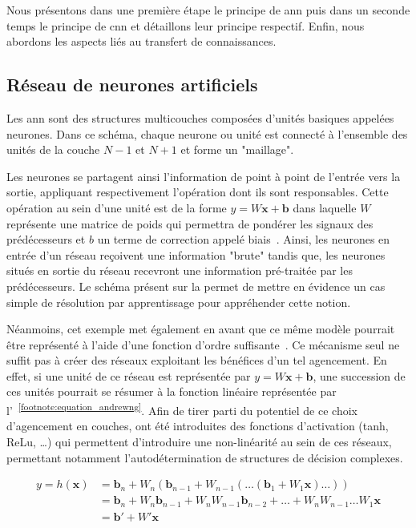 Nous présentons dans une première étape le principe de \gls{ann} puis dans un seconde temps le principe de \gls{cnn} et détaillons leur principe respectif. Enfin, nous abordons les aspects liés au transfert de connaissances.\par

\subsection{Réseau de neurones artificiels}
Les \gls{ann} sont des structures multicouches composées d'unités basiques appelées neurones. Dans ce schéma, chaque neurone ou unité est connecté à l'ensemble des unités de la couche $N-1$ et $N+1$ et forme un "maillage".\par

Les neurones se partagent ainsi l'information de point à point de l'entrée vers la sortie, appliquant respectivement l'opération dont ils sont responsables. Cette opération au sein d'une unité est de la forme $y = W\mathbf{x}+\mathbf{b}$ dans laquelle $W$ représente une matrice de poids qui permettra de pondérer les signaux des prédécesseurs et $b$ un terme de correction appelé biais~\cite{Stephen1990}. Ainsi, les neurones en entrée d'un réseau reçoivent une information "brute" tandis que, les neurones situés en sortie du réseau recevront une information pré-traitée par les prédécesseurs. Le schéma présent sur la  permet de mettre en évidence un cas simple de résolution par apprentissage pour appréhender cette notion.\par

Néanmoins, cet exemple met également en avant que ce même modèle pourrait être représenté à l'aide d'une fonction d'ordre suffisante~\cite{Bishop2006}. Ce mécanisme seul ne suffit pas à créer des réseaux exploitant les bénéfices d'un tel agencement. En effet, si une unité de ce réseau est représentée par $y = W\mathbf{x}+\mathbf{b}$, une succession de ces unités pourrait se résumer à la fonction linéaire représentée par l'~\textsuperscript{\ref{footnote:equation_andrewng}}. Afin de tirer parti du potentiel de ce choix d'agencement en couches, ont été introduites des fonctions d'activation (tanh, ReLu, \ldots) qui permettent d'introduire une non-linéarité au sein de ces réseaux, permettant notamment l’autodétermination de structures de décision complexes.\par

\begin{equation} 
    \label{eq:proof_linearity}
    \begin{split}
        y = h(\mathbf{x})   &=\mathbf{b}_n+W_n(\mathbf{b}_{n-1}+W_{n-1}(\dots (\mathbf{b}_1+W_1 \mathbf{x})\dots))\\
                            &=\mathbf{b}_n+W_n\mathbf{b}_{n-1}+W_nW_{n-1}\mathbf{b}_{n-2}+\dots+W_nW_{n-1}\dots W_1\mathbf{x}\\
                            &=\mathbf{b}'+W'\mathbf{x}
    \end{split}
\end{equation}
\par

